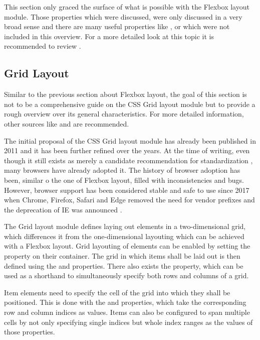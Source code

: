 This section only graced the surface of what is possible with the Flexbox layout module. 
Those properties which were discussed, were only discussed in a very broad sense and there are many useful properties like ,  or  which were not included in this overview. 
For a more detailed look at this topic it is recommended to review \cite{CSSFlexbox}.

\subsection{Grid Layout}
\label{sec:Grid}

Similar to the previous section about Flexbox layout, the goal of this section is not to be a comprehensive guide on the CSS Grid layout module but to provide a rough overview over its general characteristics. 
For more detailed information, other sources like \cite{GridLayoutInCSS} and \cite{CSSGrid} are recommended.

The initial proposal of the CSS Grid layout module has already been published in 2011 \parencite{CSSGridFirstDraft} and it has been further refined over the years. 
At the time of writing, even though it still exists as merely a candidate recommendation for standardization \parencite{CSSGrid}, many browsers have already adopted it. 
The history of browser adoption has been, similar o the one of Flexbox layout, filled with inconsistencies and bugs. 
However, browser support has been considered stable and safe to use since 2017 when Chrome, Firefox, Safari and Edge removed the need for vendor prefixes and the deprecation of IE was announced \parencite{CanIUseCSSGrid}.

The Grid layout module defines laying out elements in a two-dimensional grid, which differences it from the one-dimensional layouting which can be achieved with a Flexbox layout. 
Grid layouting of elements can be enabled by setting the  property on their container. 
The grid in which items shall be laid out is then defined using the  and  properties. 
There also exists the  property, which can be used as a shorthand to simultaneously specify both rows and columns of a grid.

Item elements need to specify the cell of the grid into which they shall be positioned. 
This is done with the  and  properties, which take the corresponding row and column indices as values. 
Items can also be configured to span multiple cells by not only specifying single indices but whole index ranges as the values of those properties.

